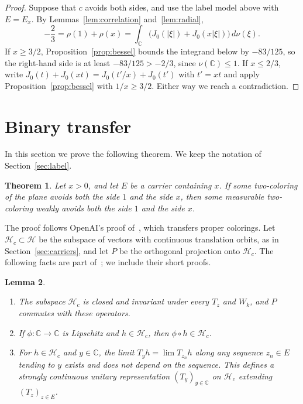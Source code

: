 \documentclass[10pt]{article}
\newtheorem{thm}{Theorem}[section]
\newtheorem{lem}[thm]{Lemma}
\theoremstyle{remark}
\newcommand{\C}{\mathbb C}
\newcommand{\calH}{\mathcal H}
\begin{document}
\begin{proof}
Suppose that $c$ avoids both sides, and use the label model above with $E=E_x$. By Lemmas~\ref{lem:correlation} and~\ref{lem:radial},
\[
 -\frac23=\rho(1)+\rho(x)=\int_\C\bigl(J_0(|\xi|)+J_0(x|\xi|)\bigr)\,d\nu(\xi).
\]
If $x\ge3/2$, Proposition~\ref{prop:bessel} bounds the integrand below by $-83/125$, so the right-hand side is at least $-83/125>-2/3$, since $\nu(\C)\le1$. If $x\le2/3$, write $J_0(t)+J_0(xt)=J_0(t'/x)+J_0(t')$ with $t'=xt$ and apply Proposition~\ref{prop:bessel} with $1/x\ge3/2$. Either way we reach a contradiction.
\end{proof}

\section{Binary transfer}\label{sec:transfer}

In this section we prove the following theorem. We keep the notation of Section~\ref{sec:label}.

\begin{thm}\label{thm:transfer}
Let $x>0$, and let $E$ be a carrier containing $x$. If some two-coloring of the plane avoids both the side $1$ and the side $x$, then some measurable two-coloring weakly avoids both the side $1$ and the side $x$.
\end{thm}

The proof follows OpenAI's proof of~\cite[Proposition~4.2]{OAI}, which transfers proper colorings. Let $\calH_c\subset\calH$ be the subspace of vectors with continuous translation orbits, as in Section~\ref{sec:carriers}, and let $P$ be the orthogonal projection onto $\calH_c$. The following facts are part of~\cite[Lemma~4.1]{OAI}; we include their short proofs.

\begin{lem}\label{lem:continuous}
\begin{enumerate}
\item[(a)] The subspace $\calH_c$ is closed and invariant under every $T_z$ and $W_k$, and $P$ commutes with these operators.
\item[(b)] If $\phi\colon\C\to\C$ is Lipschitz and $h\in\calH_c$, then $\phi\circ h\in\calH_c$.
\item[(c)] For $h\in\calH_c$ and $y\in\C$, the limit $T_yh=\lim T_{z_n}h$ along any sequence $z_n\in E$ tending to $y$ exists and does not depend on the sequence. This defines a strongly continuous unitary representation $(T_y)_{y\in\C}$ on $\calH_c$ extending $(T_z)_{z\in E}$.
\end{enumerate}
\end{lem}
\end{document}
